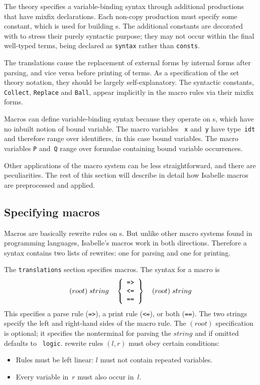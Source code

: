 The theory specifies a variable-binding syntax through additional productions
that have mixfix declarations.  Each non-copy production must specify some
constant, which is used for building \AST{}s.  The
additional constants are decorated with {\tt\at} to stress their purely
syntactic purpose; they may not occur within the final well-typed terms,
being declared as {\tt syntax} rather than {\tt consts}.

The translations cause the replacement of external forms by internal forms
after parsing, and vice versa before printing of terms.  As a specification
of the set theory notation, they should be largely self-explanatory.  The
syntactic constants, {\tt\at Collect}, {\tt\at Replace} and {\tt\at Ball},
appear implicitly in the macro rules via their mixfix forms.

Macros can define variable-binding syntax because they operate on \AST{}s,
which have no inbuilt notion of bound variable.  The macro variables {\tt
  x} and~{\tt y} have type~{\tt idt} and therefore range over identifiers,
in this case bound variables.  The macro variables {\tt P} and~{\tt Q}
range over formulae containing bound variable occurrences.

Other applications of the macro system can be less straightforward, and
there are peculiarities.  The rest of this section will describe in detail
how Isabelle macros are preprocessed and applied.


\subsection{Specifying macros}
Macros are basically rewrite rules on \AST{}s.  But unlike other macro
systems found in programming languages, Isabelle's macros work in both
directions.  Therefore a syntax contains two lists of rewrites: one for
parsing and one for printing.

The {\tt translations} section specifies macros.  The syntax for a macro is
\[ (root)\; string \quad
   \left\{\begin{array}[c]{c} \mbox{\tt =>} \\ \mbox{\tt <=} \\ \mbox{\tt ==} \end{array}
   \right\} \quad
   (root)\; string
\]
%
This specifies a parse rule ({\tt =>}), a print rule ({\tt <=}), or both
({\tt ==}).  The two strings specify the left and right-hand sides of the
macro rule.  The $(root)$ specification is optional; it specifies the
nonterminal for parsing the $string$ and if omitted defaults to {\tt
  logic}.  \AST{} rewrite rules $(l, r)$ must obey certain conditions:
\begin{itemize}
\item Rules must be left linear: $l$ must not contain repeated variables.

\item Every variable in~$r$ must also occur in~$l$.
\end{itemize}

